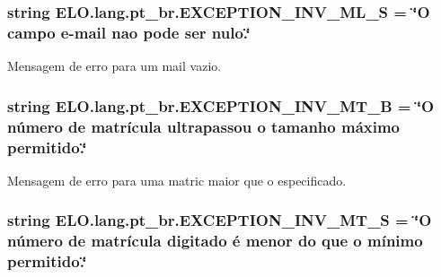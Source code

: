 \hypertarget{namespaceELO_1_1lang_1_1pt__br_aebc52db367f49633fb2545dcf40a7fac}{
\subsubsection[{E\-X\-C\-E\-P\-T\-I\-O\-N\-\_\-\-I\-N\-V\-\_\-\-M\-L\-\_\-\-S}]{\setlength{\rightskip}{0pt plus 5cm}string E\-L\-O.\-lang.\-pt\-\_\-br.\-E\-X\-C\-E\-P\-T\-I\-O\-N\-\_\-\-I\-N\-V\-\_\-\-M\-L\-\_\-\-S = \char`\"{}O campo e-\/mail nao pode ser nulo.\char`\"{}}}\label{d5/d70/namespaceELO_1_1lang_1_1pt__br_aebc52db367f49633fb2545dcf40a7fac}


Mensagem de erro para um mail vazio. 

\hypertarget{namespaceELO_1_1lang_1_1pt__br_a29e0f9e093008c2fe9f36ed60b0782ce}{
\subsubsection[{E\-X\-C\-E\-P\-T\-I\-O\-N\-\_\-\-I\-N\-V\-\_\-\-M\-T\-\_\-\-B}]{\setlength{\rightskip}{0pt plus 5cm}string E\-L\-O.\-lang.\-pt\-\_\-br.\-E\-X\-C\-E\-P\-T\-I\-O\-N\-\_\-\-I\-N\-V\-\_\-\-M\-T\-\_\-\-B = \char`\"{}O número de matrícula ultrapassou o tamanho máximo permitido.\char`\"{}}}\label{d5/d70/namespaceELO_1_1lang_1_1pt__br_a29e0f9e093008c2fe9f36ed60b0782ce}


Mensagem de erro para uma matric maior que o especificado. 

\hypertarget{namespaceELO_1_1lang_1_1pt__br_a352f2d27b1164858953aa20ef9bf0989}{
\subsubsection[{E\-X\-C\-E\-P\-T\-I\-O\-N\-\_\-\-I\-N\-V\-\_\-\-M\-T\-\_\-\-S}]{\setlength{\rightskip}{0pt plus 5cm}string E\-L\-O.\-lang.\-pt\-\_\-br.\-E\-X\-C\-E\-P\-T\-I\-O\-N\-\_\-\-I\-N\-V\-\_\-\-M\-T\-\_\-\-S = \char`\"{}O número de matrícula digitado é menor do que o mínimo permitido.\char`\"{}}}\label{d5/d70/namespaceELO_1_1lang_1_1pt__br_a352f2d27b1164858953aa20ef9bf0989}


